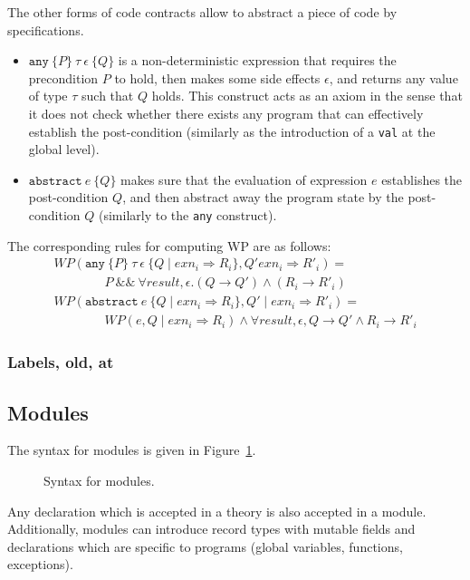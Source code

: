 The other forms of code contracts allow to abstract a piece of code by specifications.
\begin{itemize}
\item $\texttt{any}~\{ P \}~\tau~\epsilon~\{ Q \}$ is a
  non-deterministic expression that requires the precondition $P$ to
  hold, then makes some side effects $\epsilon$, and returns any value
  of type $\tau$ such that $Q$ holds. This construct acts as an axiom
  in the sense that it does not check whether there exists any program
  that can effectively establish the post-condition (similarly as the
  introduction of a \texttt{val} at the global level).
\item $\texttt{abstract}~e~\{ Q \}$ makes sure that the evaluation of
  expression $e$ establishes the post-condition $Q$, and then abstract
  away the program state by the post-condition $Q$ (similarly to the
  \texttt{any} construct).
\end{itemize}
The corresponding rules for computing WP are as follows:
\[
\begin{array}{l}
  WP(\texttt{any}~\{ P \}~\tau~\epsilon~\{ Q \mid exn_i \Rightarrow R_i \} ,
  Q'  exn_i \Rightarrow R'_i) = \\
  \qquad\qquad P \mathop{\&\&} \forall result, \epsilon.
  (Q \rightarrow Q') \land (R_i \rightarrow R'_i) \\
  WP(\texttt{abstract}~e~\{ Q \mid exn_i \Rightarrow R_i \} ,
  Q' \mid exn_i \Rightarrow R'_i) = \\
  \qquad\qquad WP(e,Q \mid exn_i \Rightarrow R_i) \land
  \forall result, \epsilon, Q \rightarrow Q' \land R_i \rightarrow R'_i
\end{array}
\]

\subsubsection{Labels, old, at}

\todo{}

\subsection{Modules}

The syntax for modules is given in Figure~\ref{fig:bnf:module}.
\begin{figure}
  \begin{center}\framebox{}\end{center}
  \caption{Syntax for modules.}
\label{fig:bnf:module}
\end{figure}
Any declaration which is accepted in a theory is also accepted in a
module. Additionally, modules can introduce record types with mutable
fields and declarations which are specific to programs (global
variables, functions, exceptions).

